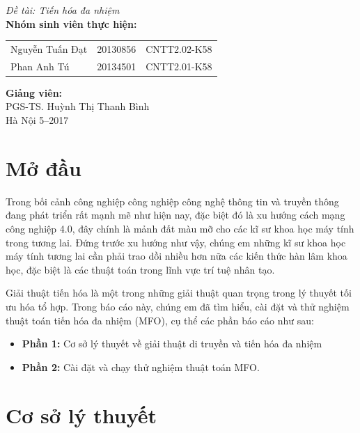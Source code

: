 \documentclass[a4paper,12pt]{report}
\renewcommand{\contentsname}{Mục lục}
\begin{document}
\begin{center}
{\fontsize{18}{20}\selectfont \emph{Đề tài: Tiến hóa đa nhiệm }}\\[2cm]
\hspace{-5cm}\fontsize{14}{16}\selectfont \textbf{Nhóm sinh viên thực hiện:}\\[0.1cm] 
\begin{longtable}{l c c}
Nguyễn Tuấn Đạt & 20130856 & CNTT2.02-K58 \\
Phan Anh Tú &   20134501 & CNTT2.01-K58\\
\end{longtable}
\vspace{0.5cm}
\hspace{-8.5cm}\fontsize{14}{16}\selectfont \textbf{Giảng viên:}\\[0.1cm]
\hspace{-2.7cm}\fontsize{14}{16}\selectfont PGS-TS. Huỳnh Thị Thanh Bình \\[3cm]
\fontsize{16}{19}\selectfont Hà Nội 5--2017
\end{center}
\newpage
\pdfbookmark{\contentsname}{toc}
\tableofcontents
\listoffigures

\chapter*{Mở đầu}
Trong bối cảnh công nghiệp công nghiệp công nghệ thông tin và truyền thông đang phát triển rất mạnh mẽ như hiện nay, đặc biệt đó là xu hướng cách mạng công nghiệp 4.0, đây chính là mảnh đất màu mỡ cho các kĩ sư khoa học máy tính trong tương lai. Đứng trước xu hướng như vậy, chúng em những kĩ sư khoa học máy tính tương lai cần phải trao dồi nhiều hơn nữa các kiến thức hàn lâm khoa học, đặc biệt là các thuật toán trong lĩnh vực trí tuệ nhân tạo. 

Giải thuật tiến hóa là một trong những giải thuật quan trọng trong lý thuyết tối ưu hóa tổ hợp. Trong báo cáo này, chúng em đã tìm hiểu, cài đặt và thử nghiệm thuật toán tiến hóa đa nhiệm (MFO), cụ thể các phần báo cáo như sau:
\begin{itemize}
\item \textbf{Phần 1: }Cơ sở lý thuyết về giải thuật di truyền và tiến hóa đa nhiệm
\item \textbf{Phần 2: }Cài đặt và chạy thử nghiệm thuật toán MFO.
\end{itemize}

\chapter{Cơ sở lý thuyết}
\end{document}
